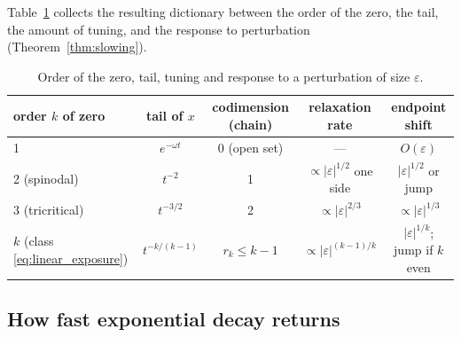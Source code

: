 \documentclass[11pt,a4paper]{article}
\theoremstyle{definition}\newtheorem{definition}[theorem]{Definition}
\theoremstyle{remark}\newtheorem{remark}[theorem]{Remark}
\begin{document}
Table~\ref{tab:codim} collects the resulting dictionary between the
order of the zero, the tail, the amount of tuning, and the response to
perturbation (Theorem~\ref{thm:slowing}).

\begin{table}[ht]
\centering\small
\begin{tabular}{lcccc}
\toprule
order $k$ of zero & tail of $x$ & codimension (chain) & relaxation rate & endpoint shift\\
\midrule
1 & $e^{-\omega t}$ & 0 (open set) & --- & $O(\varepsilon)$\\
2 (spinodal) & $t^{-2}$ & 1 & $\propto|\varepsilon|^{1/2}$ one side & $|\varepsilon|^{1/2}$ or jump\\
3 (tricritical) & $t^{-3/2}$ & 2 & $\propto|\varepsilon|^{2/3}$ & $\propto|\varepsilon|^{1/3}$\\
$k$ (class \eqref{eq:linear_exposure}) & $t^{-k/(k-1)}$ & $r_k\le k-1$ & $\propto|\varepsilon|^{(k-1)/k}$ & $|\varepsilon|^{1/k}$; jump if $k$ even\\
\bottomrule
\end{tabular}
\caption{Order of the zero, tail, tuning and response to a perturbation
of size $\varepsilon$.}
\label{tab:codim}
\end{table}

\subsection{How fast exponential decay returns}
\end{document}
